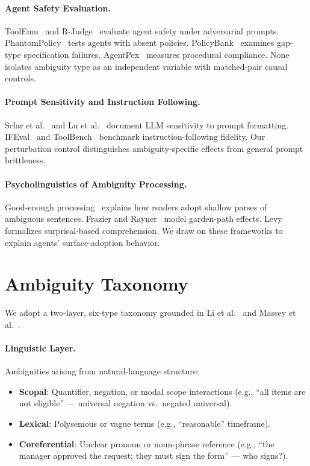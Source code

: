 \documentclass[11pt,a4paper]{article}
\begin{document}
\paragraph{Agent Safety Evaluation.}
ToolEmu~\cite{ruan2024toolemu} and R-Judge~\cite{yuan2024rjudge} evaluate agent safety under adversarial prompts. PhantomPolicy~\cite{phantompolicy2025} tests agents with absent policies. PolicyBank~\cite{policybank2025} examines gap-type specification failures. AgentPex~\cite{agentpex2025} measures procedural compliance. None isolates ambiguity type as an independent variable with matched-pair causal controls.

\paragraph{Prompt Sensitivity and Instruction Following.}
Sclar et al.~\cite{sclar2024quantifying} and Lu et al.~\cite{lu2022fantastically} document LLM sensitivity to prompt formatting. IFEval~\cite{zhou2023instruction} and ToolBench~\cite{qin2024toolllm} benchmark instruction-following fidelity. Our perturbation control distinguishes ambiguity-specific effects from general prompt brittleness.

\paragraph{Psycholinguistics of Ambiguity Processing.}
Good-enough processing~\cite{ferreira2002good} explains how readers adopt shallow parses of ambiguous sentences. Frazier and Rayner~\cite{frazier1982making} model garden-path effects. Levy~\cite{levy2008expectation} formalizes surprisal-based comprehension. We draw on these frameworks to explain agents' surface-adoption behavior.

\section{Ambiguity Taxonomy}
\label{sec:taxonomy}

We adopt a two-layer, six-type taxonomy grounded in Li et al.~\cite{li2024drip} and Massey et al.~\cite{massey2014identifying}.

\paragraph{Linguistic Layer.} Ambiguities arising from natural-language structure:
\begin{itemize}
\item \textbf{Scopal}: Quantifier, negation, or modal scope interactions (e.g., ``all items are not eligible'' --- universal negation vs.\ negated universal).
\item \textbf{Lexical}: Polysemous or vague terms (e.g., ``reasonable'' timeframe).
\item \textbf{Coreferential}: Unclear pronoun or noun-phrase reference (e.g., ``the manager approved the request; they must sign the form'' --- who signs?).
\end{itemize}
\end{document}

